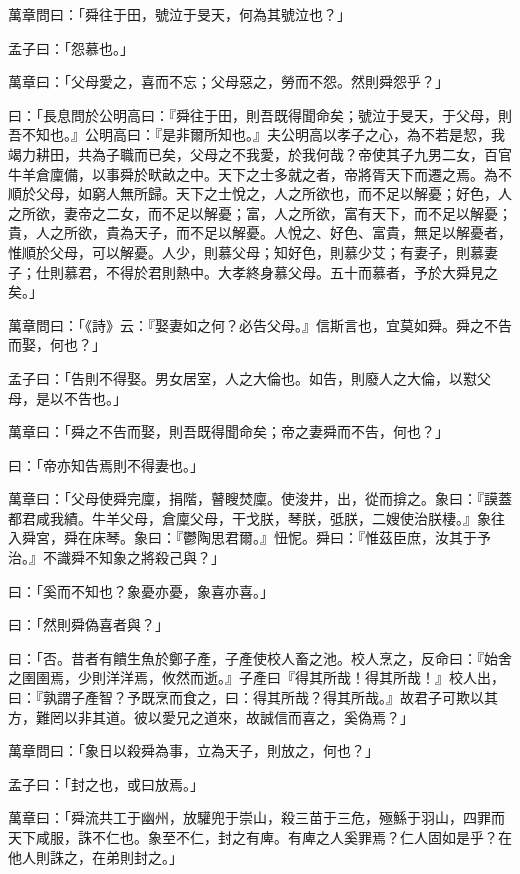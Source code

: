 
\begin{pinyinscope}
萬章問曰：「舜往于田，號泣于旻天，何為其號泣也？」

孟子曰：「怨慕也。」

萬章曰：「父母愛之，喜而不忘；父母惡之，勞而不怨。然則舜怨乎？」

曰：「長息問於公明高曰：『舜往于田，則吾既得聞命矣；號泣于旻天，于父母，則吾不知也。』公明高曰：『是非爾所知也。』夫公明高以孝子之心，為不若是恝，我竭力耕田，共為子職而已矣，父母之不我愛，於我何哉？帝使其子九男二女，百官牛羊倉廩備，以事舜於畎畝之中。天下之士多就之者，帝將胥天下而遷之焉。為不順於父母，如窮人無所歸。天下之士悅之，人之所欲也，而不足以解憂；好色，人之所欲，妻帝之二女，而不足以解憂；富，人之所欲，富有天下，而不足以解憂；貴，人之所欲，貴為天子，而不足以解憂。人悅之、好色、富貴，無足以解憂者，惟順於父母，可以解憂。人少，則慕父母；知好色，則慕少艾；有妻子，則慕妻子；仕則慕君，不得於君則熱中。大孝終身慕父母。五十而慕者，予於大舜見之矣。」

萬章問曰：「《詩》云：『娶妻如之何？必告父母。』信斯言也，宜莫如舜。舜之不告而娶，何也？」

孟子曰：「告則不得娶。男女居室，人之大倫也。如告，則廢人之大倫，以懟父母，是以不告也。」

萬章曰：「舜之不告而娶，則吾既得聞命矣；帝之妻舜而不告，何也？」

曰：「帝亦知告焉則不得妻也。」

萬章曰：「父母使舜完廩，捐階，瞽瞍焚廩。使浚井，出，從而揜之。象曰：『謨蓋都君咸我績。牛羊父母，倉廩父母，干戈朕，琴朕，弤朕，二嫂使治朕棲。』象往入舜宮，舜在床琴。象曰：『鬱陶思君爾。』忸怩。舜曰：『惟茲臣庶，汝其于予治。』不識舜不知象之將殺己與？」

曰：「奚而不知也？象憂亦憂，象喜亦喜。」

曰：「然則舜偽喜者與？」

曰：「否。昔者有饋生魚於鄭子產，子產使校人畜之池。校人烹之，反命曰：『始舍之圉圉焉，少則洋洋焉，攸然而逝。』子產曰『得其所哉！得其所哉！』校人出，曰：『孰謂子產智？予既烹而食之，曰：得其所哉？得其所哉。』故君子可欺以其方，難罔以非其道。彼以愛兄之道來，故誠信而喜之，奚偽焉？」

萬章問曰：「象日以殺舜為事，立為天子，則放之，何也？」

孟子曰：「封之也，或曰放焉。」

萬章曰：「舜流共工于幽州，放驩兜于崇山，殺三苗于三危，殛鯀于羽山，四罪而天下咸服，誅不仁也。象至不仁，封之有庳。有庳之人奚罪焉？仁人固如是乎？在他人則誅之，在弟則封之。」


\end{pinyinscope}
